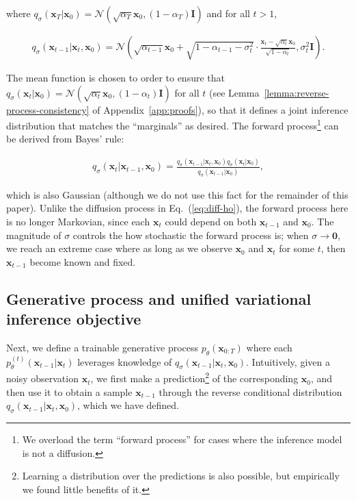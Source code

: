 where $q_\sigma({\bm{x}}_{T} | {\bm{x}}_0) = {\mathcal{N}}(\sqrt{\alpha_T} {\bm{x}}_0, (1 - \alpha_T) {\bm{I}})$ and for all $t > 1$,

\begin{gather} 
   q_\sigma({\bm{x}}_{t-1} | {\bm{x}}_t, {\bm{x}}_0) = {\mathcal{N}}\left(\sqrt{\alpha_{t-1}} {\bm{x}}_{0} + \sqrt{1 - \alpha_{t-1} - \sigma^2_t} \cdot {\frac{{\bm{x}}_{t}  - \sqrt{\alpha_{t}} {\bm{x}}_0}{\sqrt{1 - \alpha_{t}}}}, \sigma_t^2 {\bm{I}} \right). \label{eq:reversed-close-form}
\end{gather}

The mean function is chosen to order to ensure that $q_\sigma({\bm{x}}_{t} | {\bm{x}}_0) = {\mathcal{N}}(\sqrt{\alpha_t} {\bm{x}}_0, (1 - \alpha_t) {\bm{I}})$ for all $t$ (see Lemma~\ref{lemma:reverse-process-consistency} of Appendix~\ref{app:proofs}), so that it defines a joint inference distribution that matches the ``marginals'' as desired. The forward process\footnote{We overload the term ``forward process'' for cases where the inference model is not a diffusion.} can be derived from Bayes' rule:

\begin{align}
    q_\sigma({\bm{x}}_{t} | {\bm{x}}_{t-1}, {\bm{x}}_0) = \frac{q_\sigma({\bm{x}}_{t-1} | {\bm{x}}_{t}, {\bm{x}}_0) q_\sigma({\bm{x}}_{t} | {\bm{x}}_0)}{q_\sigma({\bm{x}}_{t-1} | {\bm{x}}_0)}, \label{eq:bayes-rule}
\end{align}

which is also Gaussian (although we do not use this fact for the remainder of this paper). Unlike the diffusion process in Eq.~(\ref{eq:diff-ho}), 
the forward process here is no longer Markovian, since each ${\bm{x}}_t$ could depend on both ${\bm{x}}_{t-1}$ and ${\bm{x}}_0$. The magnitude of $\sigma$ controls the how stochastic the forward process is; when $\sigma \to {\bm{0}}$, 
we reach an extreme case where as long as we observe ${\bm{x}}_0$ and ${\bm{x}}_t$ for some $t$, then ${\bm{x}}_{t-1}$ become known and fixed. 

\subsection{Generative process and unified variational inference objective}

Next, we define a trainable generative process $p_\theta({\bm{x}}_{0:T})$ where each $p_{\theta}^{(t)}({\bm{x}}_{t-1} | {\bm{x}}_t)$ 
 leverages knowledge of $q_\sigma({\bm{x}}_{t-1} | {\bm{x}}_{t}, {\bm{x}}_0)$. 
Intuitively, given a noisy observation ${\bm{x}}_t$, we first make a prediction\footnote{Learning a distribution over the predictions is also possible, but empirically we found little benefits of it.} of the corresponding ${\bm{x}}_0$, 
and then use it to obtain a sample ${\bm{x}}_{t-1}$ through the reverse conditional distribution $q_\sigma({\bm{x}}_{t-1} | {\bm{x}}_{t}, {\bm{x}}_0)$, which we have defined. 


